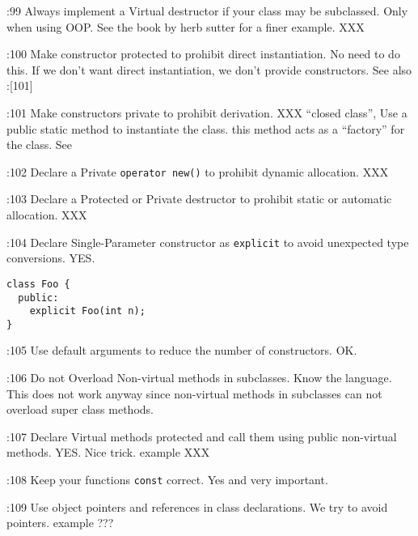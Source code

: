 \documentclass{book}
\newcommand{\name}[1]{\texttt{#1}}
\begin{document}
\cite{OKL_MisfeldtBumgardnerGray2004CppStyle}:99 Always implement a Virtual destructor if your class may be subclassed. Only when using OOP. See the book by herb sutter for a finer example. XXX

\cite{OKL_MisfeldtBumgardnerGray2004CppStyle}:100 Make constructor protected to prohibit direct instantiation. No need to do this. If we don't want direct instantiation, we don't provide constructors. See also \cite{OKL_MisfeldtBumgardnerGray2004CppStyle}:[101]

\cite{OKL_MisfeldtBumgardnerGray2004CppStyle}:101 Make constructors private to prohibit derivation. XXX ``closed class'', Use a public static method to instantiate the class. this method acts as a ``factory''  for the class. See \cite{OKL_GammaHelmJohnsonVlissides1994DesignPattern}

\cite{OKL_MisfeldtBumgardnerGray2004CppStyle}:102 Declare a Private \name{operator new()} to prohibit dynamic allocation. XXX

\cite{OKL_MisfeldtBumgardnerGray2004CppStyle}:103 Declare a Protected or Private destructor to prohibit static or automatic allocation. XXX

\cite{OKL_MisfeldtBumgardnerGray2004CppStyle}:104 Declare Single-Parameter constructor as \name{explicit} to avoid unexpected type conversions. YES. 

\begin{verbatim}
class Foo {
  public:
    explicit Foo(int n);
}
\end{verbatim}

\cite{OKL_MisfeldtBumgardnerGray2004CppStyle}:105 Use default arguments to reduce the number of constructors. OK.

\cite{OKL_MisfeldtBumgardnerGray2004CppStyle}:106 Do not Overload Non-virtual methods in subclasses. Know the language. This does not work anyway since non-virtual methods in subclasses can not overload super class methods.

\cite{OKL_MisfeldtBumgardnerGray2004CppStyle}:107 Declare Virtual methods protected and call them using public non-virtual methods. YES. Nice trick. example XXX

\cite{OKL_MisfeldtBumgardnerGray2004CppStyle}:108 Keep your functions \name{const} correct. Yes and very important. 

\cite{OKL_MisfeldtBumgardnerGray2004CppStyle}:109 Use object pointers and references in class declarations. We try to avoid pointers. example ??? 
\end{document}
